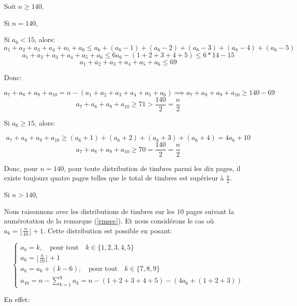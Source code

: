 \documentclass[12pt,a4paper,article]{memoir}
\newcommand{\floor}[1]{\lfloor #1 \rfloor}
\begin{document}
\bigskip

Soit $n \geq 140$, 

\bigskip

Si $n = 140$, 

\bigskip

Si $a_{6} < 15$, alors: 
\[a_{1} + a_{2} + a_{3} + a_{4} + a_{5} + a_{6} \leq a_{6}  + (a_{6} - 1) + (a_{6} - 2) + (a_{6} - 3) + (a_{6} - 4) + (a_{6} - 5)\]
\[a_{1} + a_{2} + a_{3} + a_{4} + a_{5} + a_{6} \leq 6a_{6}  - (1 + 2 + 3 + 4 + 5) \leq 6*14 - 15\]
\[a_{1} + a_{2} + a_{3} + a_{4} + a_{5} + a_{6} \leq 69\]

Donc:

\[a_{7} + a_{8} + a_{9} + a_{10} = n - (a_{1} + a_{2} + a_{3} + a_{4} + a_{5} + a_{6}) \implies a_{7} + a_{8} + a_{9} + a_{10} \geq 140 - 69 \]
\[a_{7} + a_{8} + a_{9} + a_{10} \geq 71 > \frac{140}{2} = \frac{n}{2}\]

Si $a_{6} \geq 15$, alors: 

\[a_{7} + a_{8} + a_{9} + a_{10} \geq (a_{6} + 1) + (a_{6} + 2) + (a_{6} + 3) + (a_{6} + 4)  = 4a_{6} + 10\]
\[a_{7} + a_{8} + a_{9} + a_{10} \geq 70 = \frac{140}{2} = \frac{n}{2}\]

Donc, pour $n=140$, pour toute distribution de timbres parmi les dix pages, il existe toujours quatre pages telles que le total de timbres est supérieur à $\frac{n}{2}$.

\bigskip

Si $n > 140$, 

\bigskip

Nous raisonnons avec les distributions de timbres sur les $10$ pages suivant la numérotation de la remarque (\ref{rmsec}).  Et nous considérons le cas où $a_{6} = \floor{\frac{n}{10}} + 1$. Cette distribution est possible en posant:

\begin{equation}
\left\{
	\begin{array}{l}
	a_{k} = k, \quad \textrm{pour tout} \quad k \in \{1, 2, 3, 4, 5\}\\
	a_{6} = \floor{\frac{n}{10}} + 1\\
	a_{k} = a_{6} + (k - 6), \quad \textrm{pour tout} \quad k \in \{7, 8, 9\}\\
	a_{10} = n - \sum_{k=1}^{9} a_{k} = n - (1 + 2 + 3 + 4 + 5) - (4a_{6} + (1 + 2 + 3))
	\end{array}
\right.
\label{equation-def-exp-distsup140}
\end{equation}

En effet:
\end{document}
